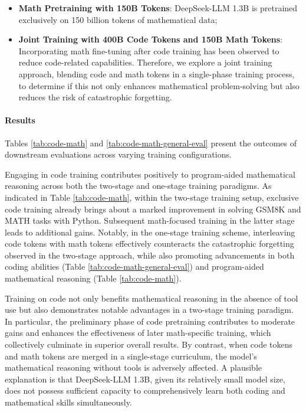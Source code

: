 \begin{itemize}[topsep=0pt]
\begin{itemize}[topsep=0pt]
\begin{itemize}[topsep=0pt]
    \item \textbf{Math Pretraining with 150B Tokens}: DeepSeek-LLM 1.3B is pretrained exclusively on 150 billion tokens of mathematical data;
    \item \textbf{Joint Training with 400B Code Tokens and 150B Math Tokens}: Incorporating math fine-tuning after code training has been observed to reduce code-related capabilities. Therefore, we explore a joint training approach, blending code and math tokens in a single-phase training process, to determine if this not only enhances mathematical problem-solving but also reduces the risk of catastrophic forgetting.
\end{itemize}

\paragraph{Results}
Tables \ref{tab:code-math} and \ref{tab:code-math-general-eval} present the outcomes of downstream evaluations across varying training configurations.

Engaging in code training contributes positively to program-aided mathematical reasoning across both the two-stage and one-stage training paradigms. As indicated in Table \ref{tab:code-math}, within the two-stage training setup, exclusive code training already brings about a marked improvement in solving GSM8K and MATH tasks with Python. Subsequent math-focused training in the latter stage leads to additional gains. Notably, in the one-stage training scheme, interleaving code tokens with math tokens effectively counteracts the catastrophic forgetting observed in the two-stage approach, while also promoting advancements in both coding abilities (Table \ref{tab:code-math-general-eval}) and program-aided mathematical reasoning (Table \ref{tab:code-math}).

Training on code not only benefits mathematical reasoning in the absence of tool use but also demonstrates notable advantages in a two-stage training paradigm. In particular, the preliminary phase of code pretraining contributes to moderate gains and enhances the effectiveness of later math-specific training, which collectively culminate in superior overall results. By contrast, when code tokens and math tokens are merged in a single-stage curriculum, the model’s mathematical reasoning without tools is adversely affected. A plausible explanation is that DeepSeek-LLM 1.3B, given its relatively small model size, does not possess sufficient capacity to comprehensively learn both coding and mathematical skills simultaneously.


\end{itemize}
\end{itemize}
